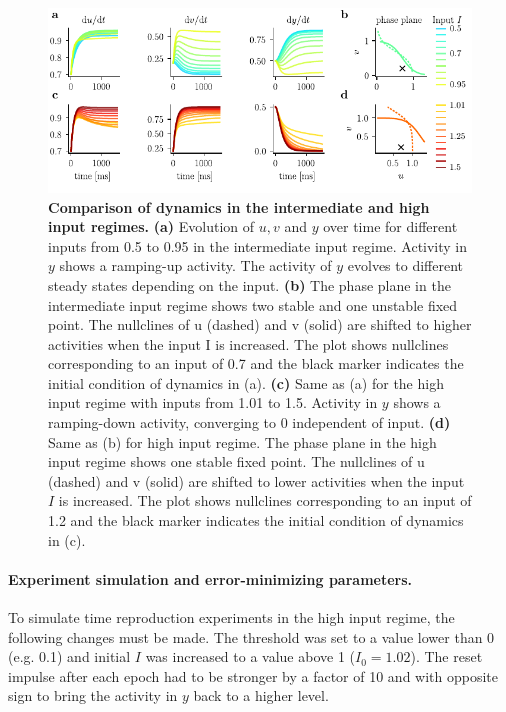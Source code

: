 \documentclass[10pt]{article}
\begin{document}
\begin{figure}[ht]
	\centering
	\includegraphics{figures/supp_regimes.pdf}
	\caption{\textbf{Comparison of dynamics in the intermediate and high input regimes.} 
	\textbf{(a)} Evolution of $u, v$ and $y$ over time for different inputs from 0.5 to 0.95 in the intermediate input regime. Activity in $y$ shows a ramping-up activity. The activity of $y$ evolves to different steady states depending on the input. 
	\textbf{(b)}  The phase plane in the intermediate input regime shows two stable and one unstable fixed point. The nullclines of u (dashed) and v (solid) are shifted to higher activities when the input I is increased. The plot shows nullclines corresponding to an input of 0.7 and the black marker indicates the initial condition of dynamics in (a).
	\textbf{(c)} Same as (a) for the high input regime with inputs from 1.01 to 1.5. Activity in $y$ shows a ramping-down activity, converging to 0 independent of input.
	\textbf{(d)} Same as (b) for high input regime.  The phase plane in the high input
	regime shows one stable fixed point. The nullclines of u (dashed) and v (solid) are
	shifted to lower activities when the input $I$ is increased. The plot shows nullclines corresponding to an input of 1.2 and the black marker indicates the initial condition of dynamics in (c).
	}
\label{regimes}
\end{figure}

\paragraph{Experiment simulation and error-minimizing parameters.}
To simulate time reproduction experiments in the high input regime, the following changes must be made. 
The threshold was set to a value lower than 0 (e.g. 0.1) and initial $I$ was increased to a value above 1 ($I_0 = 1.02$). The reset impulse after each epoch had to be stronger by a factor of 10 and with opposite sign to bring the activity in $y$ back to a higher level.
\end{document}
